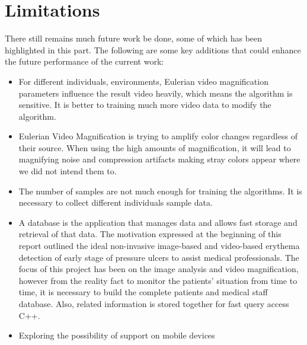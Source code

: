 \section{Limitations}
There still remains much future work be done, some of which has been highlighted in this part. The following are some key additions that could enhance the future performance of
the current work:
\begin{itemize}
\item For different individuals, environments, Eulerian video magnification parameters influence the result video heavily, which means the algorithm is sensitive. It is better to training much more video data to modify the algorithm.
\item Eulerian Video Magnification is trying to amplify color changes regardless of their source. When using the high amounts of magnification, it will lead to magnifying noise and compression artifacts making stray colors appear where we did not intend them to.
\item The number of samples are not much enough for training the algorithms. It is necessary to collect different individuals sample data.
\item A database is the application that manages data and allows fast storage and retrieval of that data. The motivation expressed at the beginning of this report outlined the ideal non-invasive image-based and video-based erythema detection of early stage of pressure ulcers to assist medical professionals. The focus of this project has been on the image analysis and video magnification, however from the reality fact to monitor the patients' situation from time to time, it is necessary to build the complete patients and medical staff database. Also, related information is stored together for fast query access C++.
\item Exploring the possibility of support on mobile devices
\end{itemize}

